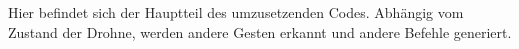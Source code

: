 Hier befindet sich der Hauptteil des umzusetzenden Codes. Abhängig vom Zustand der Drohne, werden andere Gesten erkannt und andere Befehle generiert.


